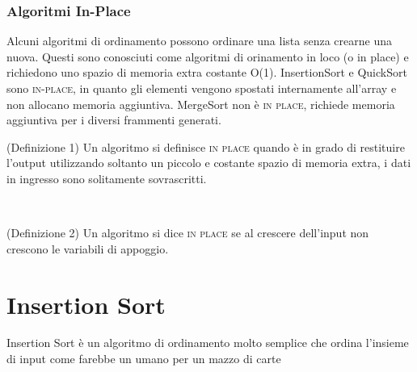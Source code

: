 \subsubsection{Algoritmi In-Place}
Alcuni algoritmi di ordinamento possono ordinare una lista senza crearne una nuova. Questi sono conosciuti come algoritmi di orinamento in loco (o in place) e richiedono uno spazio di memoria extra costante O(1). InsertionSort e QuickSort sono \textsc{in-place}, in quanto gli elementi vengono spostati internamente all'array e non allocano memoria aggiuntiva. MergeSort non è \textsc{in place}, richiede memoria aggiuntiva per i diversi frammenti generati.\smallskip\\
\colorbox{SALZO}{\parbox{\dimexpr\linewidth-2\fboxsep}{\begin{definition}
    (Definizione 1) Un algoritmo si definisce \textsc{in place} quando è in grado di restituire l'output utilizzando soltanto un piccolo e costante spazio di memoria extra, i dati in ingresso sono solitamente sovrascritti.
\end{definition}}}\smallskip\\ 
\colorbox{SALZO}{\parbox{\dimexpr\linewidth-2\fboxsep}{\begin{definition}
    (Definizione 2) Un algoritmo si dice \textsc{in place} se al crescere dell'input non crescono le variabili di appoggio.
\end{definition}}}

\section{Insertion Sort}
Insertion Sort è un algoritmo di ordinamento molto semplice che ordina l'insieme di input come farebbe un umano per un mazzo di carte

